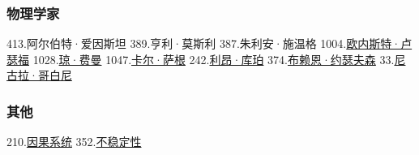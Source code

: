 \subsubsection{物理学家}
413.阿尔伯特·爱因斯坦
389.亨利·莫斯利
387.朱利安·施温格
1004.\href{https://wuli.wiki/assets/sogou/1004.\%E6\%AC\%A7\%E5\%86\%85\%E6\%96\%AF\%E7\%89\%B9\%C2\%B7\%E5\%8D\%A2\%E7\%91\%9F\%E7\%A6\%8F\%20-\%20\%E6\%90\%9C\%E7\%8B\%97\%E7\%A7\%91\%E5\%AD\%A6\%E7\%99\%BE\%E7\%A7\%91.html}{欧内斯特·卢瑟福}
1028.\href{https://wuli.wiki/assets/sogou/1028.\%E7\%90\%BC\%C2\%B7\%E8\%B4\%B9\%E6\%9B\%BC\%20-\%20\%E6\%90\%9C\%E7\%8B\%97\%E7\%A7\%91\%E5\%AD\%A6\%E7\%99\%BE\%E7\%A7\%91.html}{琼·费曼}
1047.\href{https://wuli.wiki/assets/sogou/1047.\%E5\%8D\%A1\%E5\%B0\%94\%C2\%B7\%E8\%90\%A8\%E6\%A0\%B9\%20-\%20\%E6\%90\%9C\%E7\%8B\%97\%E7\%A7\%91\%E5\%AD\%A6\%E7\%99\%BE\%E7\%A7\%91.html}{卡尔·萨根}
242.\href{https://wuli.wiki/assets/sogou/242.\%E5\%88\%A9\%E6\%98\%82\%C2\%B7\%E5\%BA\%93\%E7\%8F\%80\%20-\%20\%E6\%90\%9C\%E7\%8B\%97\%E7\%A7\%91\%E5\%AD\%A6\%E7\%99\%BE\%E7\%A7\%91.html}{利昂·库珀}
374.\href{https://wuli.wiki/assets/sogou/374.\%E5\%B8\%83\%E8\%B5\%96\%E6\%81\%A9\%C2\%B7\%E7\%BA\%A6\%E7\%91\%9F\%E5\%A4\%AB\%E6\%A3\%AE\%20-\%20\%E6\%90\%9C\%E7\%8B\%97\%E7\%A7\%91\%E5\%AD\%A6\%E7\%99\%BE\%E7\%A7\%91.html}{布赖恩·约瑟夫森}
33.\href{https://wuli.wiki/assets/sogou/33.\%E5\%B0\%BC\%E5\%8F\%A4\%E6\%8B\%89\%C2\%B7\%E5\%93\%A5\%E7\%99\%BD\%E5\%B0\%BC\%20-\%20\%E6\%90\%9C\%E7\%8B\%97\%E7\%A7\%91\%E5\%AD\%A6\%E7\%99\%BE\%E7\%A7\%91.html}{尼古拉·哥白尼}

\subsubsection{其他}
210.\href{https://wuli.wiki/assets/sogou/210.\%E5\%9B\%A0\%E6\%9E\%9C\%E7\%B3\%BB\%E7\%BB\%9F\%20-\%20\%E6\%90\%9C\%E7\%8B\%97\%E7\%A7\%91\%E5\%AD\%A6\%E7\%99\%BE\%E7\%A7\%91.html}{因果系统}
352.\href{https://wuli.wiki/assets/sogou/352.\%E4\%B8\%8D\%E7\%A8\%B3\%E5\%AE\%9A\%E6\%80\%A7\%20-\%20\%E6\%90\%9C\%E7\%8B\%97\%E7\%A7\%91\%E5\%AD\%A6\%E7\%99\%BE\%E7\%A7\%91.html}{不稳定性}

